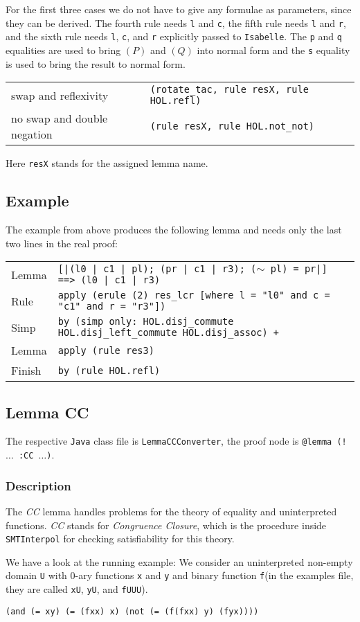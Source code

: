 \documentclass[10pt,a4paper]{article}
\newcommand{\resa}{\ensuremath{(P)}\xspace}
\newcommand{\resb}{\ensuremath{(Q)}\xspace}
\newcommand{\si}{\texttt{SMTInterpol}\xspace}
\newcommand{\isa}{\texttt{Isabelle}\xspace}
\newcommand{\jav}{\texttt{Java}\xspace}
\newcommand{\ttt}{\texttt}
\newcommand{\negat}{\ensuremath{\sim}}
\newcommand{\nega}{\negat\xspace}
\newcommand{\CC}{\emph{CC}\xspace}
\newcommand{\x}{\xX\xspace}
\newcommand{\y}{\yX\xspace}
\newcommand{\f}{\ttt{f}\xspace}
\newcommand{\xX}{\ttt{x}}
\newcommand{\yX}{\ttt{y}}
\newenvironment{rt}{\begin{center}\begin{tabular}{|l l|}\hline}{\end{tabular}\end{center}}
\newcommand{\rl}[2]{\rm{#1} & \tt{#2} \\[1mm]}
\newcommand{\rll}[2]{\rm{#1} & \tt{#2} \\\hline}
\newcommand{\exl}[2]{\exlm{#1}{\ttt{#2}}}
\newcommand{\exlm}[2]{#1 & #2 \\[1mm]}
\begin{document}
For the first three cases we do not have to give any formulae as parameters, since they can be derived. The fourth rule needs \ttt{l} and \ttt{c}, the fifth rule needs \ttt{l} and \ttt{r}, and the sixth rule needs \ttt{l}, \ttt{c}, and \ttt{r} explicitly passed to \isa. The \ttt{p} and \ttt{q} equalities are used to bring \resa and \resb into normal form and the \ttt{s} equality is used to bring the result to normal form.
%
\begin{rt}
	\rl{swap and reflexivity}{(rotate\_tac, rule resX, rule HOL.refl)}
	\rll{no swap and double negation}{(rule resX, rule HOL.not\_not)}
\end{rt}

Here \ttt{resX} stands for the assigned lemma name.
%
\subsection*{Example}
The example from above produces the following lemma and needs only the last two lines in the real proof:
%
\begin{center}
\begin{tabular}{ll}
	\exl{Lemma}{[|(l0 | c1 | pl); (pr | c1 | r3); (\nega pl) = pr|] ==> (l0 | c1 | r3)}
	\exl{Rule}{apply (erule (2) res\_lcr [where l = "l0" and c = "c1" and r = "r3"])}
	\exl{Simp}{by (simp only:~HOL.disj\_commute HOL.disj\_left\_commute HOL.disj\_assoc) +}
	\hline
	\exl{Lemma}{apply (rule res3)}
	\exl{Finish}{by (rule HOL.refl)}
\end{tabular}
\end{center}
%
\subsection{Lemma CC}\label{sec:cc}
The respective \jav class file is \ttt{LemmaCCConverter}, the proof node is \ttt{@lemma (! $\dots$ :CC $\dots$)}.
%
\subsubsection*{Description}
The \CC lemma handles problems for the theory of equality and uninterpreted functions. \CC stands for \emph{Congruence Closure}, which is the procedure inside \si for checking satisfiability for this theory.

We have a look at the running example: We consider an uninterpreted non-empty domain \ttt{U} with 0-ary functions \x and \y and binary function \f (in the examples file, they are called \ttt{xU}, \ttt{yU}, and \ttt{fUUU}).
%
\begin{center}
	\ttt{(and (= \x \y) (= (\f \x \x) \x) (not (= (\f (\f \x \x) \y) (\f \y \x))))}
\end{center}
\end{document}
